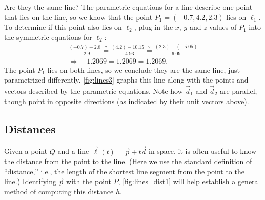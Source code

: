 {Are they the same line? The parametric equations for a line describe one point that lies on the line, so we know that the point $P_1 = (-0.7,4.2,2.3)$ lies on $\ell_1$. To determine if this point also lies on $\ell_2$, plug in the $x$, $y$ and $z$ values of $P_1$ into the symmetric equations for $\ell_2$:
\begin{multline*}
\frac{(-0.7)-2.8}{-2.9} \stackrel{?}{=} \frac{(4.2)-10.15}{-4.93} \stackrel{?}{=} \frac{(2.3)-(-5.05)}{6.09} \\
\Rightarrow \quad 1.2069=1.2069=1.2069.
\end{multline*}
%
The point $P_1$ lies on both lines, so we conclude they are the same line, just parametrized differently. \autoref{fig:lines3} graphs this line along with the points and vectors described by the parametric equations. Note how $\vec d_1$ and $\vec d_2$ are parallel, though point in opposite directions (as indicated by their unit vectors above).}

\subsection{Distances}


Given a point $Q$ and a line $\vec\ell(t) = \vec p+t\vec d$ in space, it is often useful to know the distance from the point to the line. (Here we use the standard definition of ``distance,'' i.e., the length of the shortest line segment from the point to the line.) Identifying $\vec p$ with the point $P$, \autoref{fig:lines_dist1} will help establish a general method of computing this distance $h$.

